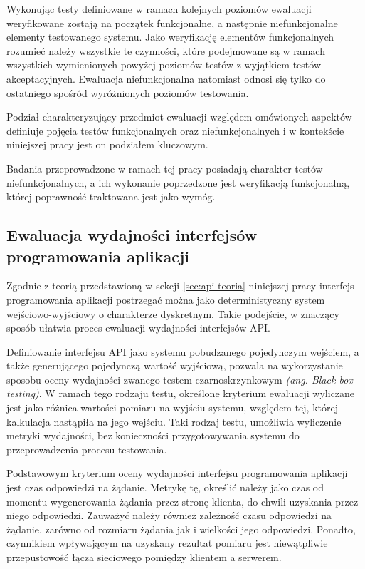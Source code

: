 Wykonując testy definiowane w ramach kolejnych poziomów ewaluacji weryfikowane zostają na początek funkcjonalne, a następnie niefunkcjonalne elementy testowanego systemu. Jako weryfikację elementów funkcjonalnych rozumieć należy wszystkie te czynności, które podejmowane są w ramach wszystkich wymienionych powyżej poziomów testów z wyjątkiem testów akceptacyjnych. Ewaluacja niefunkcjonalna natomiast odnosi się tylko do ostatniego spośród wyróżnionych poziomów testowania.

Podział charakteryzujący przedmiot ewaluacji względem omówionych aspektów definiuje pojęcia testów funkcjonalnych oraz niefunkcjonalnych i w kontekście niniejszej pracy jest on podziałem kluczowym.

Badania przeprowadzone w ramach tej pracy posiadają charakter testów niefunkcjonalnych, a ich wykonanie poprzedzone jest weryfikacją funkcjonalną, której poprawność traktowana jest jako wymóg.
\subsection*{Ewaluacja wydajności interfejsów programowania aplikacji}
Zgodnie z teorią przedstawioną w sekcji \ref{sec:api-teoria} niniejszej pracy interfejs programowania aplikacji postrzegać można jako deterministyczny system wejściowo-wyjściowy o charakterze dyskretnym. Takie podejście, w znaczący sposób ułatwia proces ewaluacji wydajności interfejsów API.

Definiowanie interfejsu API jako systemu pobudzanego pojedynczym wejściem, a także generującego pojedynczą wartość wyjściową, pozwala na wykorzystanie sposobu oceny wydajności zwanego testem czarnoskrzynkowym \textit{(ang. Black-box testing)}. W ramach tego rodzaju testu, określone kryterium ewaluacji wyliczane jest jako różnica wartości pomiaru na wyjściu systemu, względem tej, której kalkulacja nastąpiła na jego wejściu. Taki rodzaj testu, umożliwia wyliczenie metryki wydajności, bez konieczności przygotowywania systemu do przeprowadzenia procesu testowania.

Podstawowym kryterium oceny wydajności interfejsu programowania aplikacji jest czas odpowiedzi na żądanie. Metrykę tę, określić należy jako czas od momentu wygenerowania żądania przez stronę klienta, do chwili uzyskania przez niego odpowiedzi. Zauważyć należy również zależność czasu odpowiedzi na żądanie, zarówno od rozmiaru żądania jak i wielkości jego odpowiedzi. Ponadto, czynnikiem wpływającym na uzyskany rezultat pomiaru jest niewątpliwie przepustowość łącza sieciowego pomiędzy klientem a serwerem.

